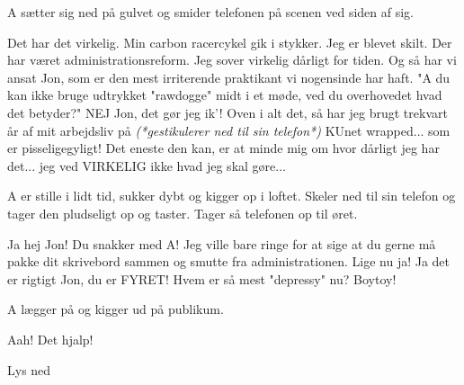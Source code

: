 \documentclass[a4paper,11pt]{article}
\begin{document}
\begin{sketch}
\scene A sætter sig ned på gulvet og smider telefonen på scenen ved siden af sig.

 Det har det virkelig. Min carbon racercykel gik i stykker. Jeg er blevet skilt. Der har været administrationsreform. Jeg sover virkelig dårligt for tiden. Og så har vi ansat Jon, som er den mest irriterende praktikant vi nogensinde har haft. "A du kan ikke bruge udtrykket "rawdogge" midt i et møde, ved du overhovedet hvad det betyder?" NEJ Jon, det gør jeg ik'!   
Oven i alt det, så har jeg brugt trekvart år af mit arbejdsliv på \textit{(*gestikulerer ned til sin telefon*)} KUnet wrapped... som er pisseligegyligt! Det eneste den kan, er at minde mig om hvor dårligt jeg har det... 
 jeg ved VIRKELIG ikke hvad jeg skal gøre... 

\scene A er stille i lidt tid, sukker dybt og kigger op i loftet. Skeler ned til sin telefon og tager den pludseligt op og taster. Tager så telefonen op til øret.

 Ja hej Jon! Du snakker med A! Jeg ville bare ringe for at sige at du gerne må pakke dit skrivebord sammen og smutte fra administrationen. Lige nu ja! Ja det er rigtigt Jon, du er FYRET! Hvem er så mest "depressy" nu? Boytoy!

\scene A lægger på og kigger ud på publikum. 

 Aah! Det hjalp! 

\scene Lys ned

\end{sketch}
\end{document}
